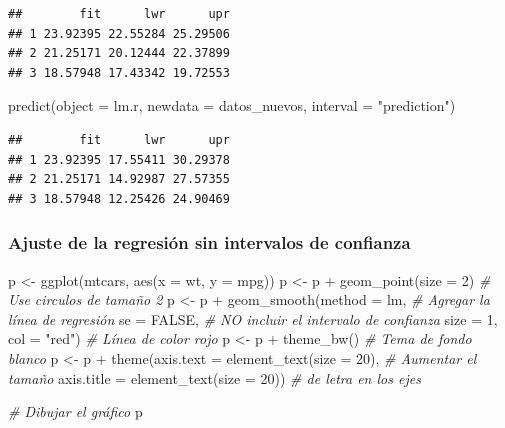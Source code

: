 \documentclass[
  12pt,
]{book}
\newenvironment{Shaded}{\begin{snugshade}}{\end{snugshade}}
\newcommand{\AttributeTok}[1]{\textcolor[rgb]{0.77,0.63,0.00}{#1}}
\newcommand{\CommentTok}[1]{\textcolor[rgb]{0.56,0.35,0.01}{\textit{#1}}}
\newcommand{\ConstantTok}[1]{\textcolor[rgb]{0.00,0.00,0.00}{#1}}
\newcommand{\DecValTok}[1]{\textcolor[rgb]{0.00,0.00,0.81}{#1}}
\newcommand{\FunctionTok}[1]{\textcolor[rgb]{0.00,0.00,0.00}{#1}}
\newcommand{\NormalTok}[1]{#1}
\newcommand{\OtherTok}[1]{\textcolor[rgb]{0.56,0.35,0.01}{#1}}
\newcommand{\SpecialCharTok}[1]{\textcolor[rgb]{0.00,0.00,0.00}{#1}}
\newcommand{\StringTok}[1]{\textcolor[rgb]{0.31,0.60,0.02}{#1}}
\theoremstyle{definition}
\theoremstyle{definition}
\theoremstyle{definition}
\theoremstyle{definition}
\theoremstyle{remark}
\begin{document}
\begin{verbatim}
##        fit      lwr      upr
## 1 23.92395 22.55284 25.29506
## 2 21.25171 20.12444 22.37899
## 3 18.57948 17.43342 19.72553
\end{verbatim}

\begin{Shaded}
\begin{Highlighting}[]
\FunctionTok{predict}\NormalTok{(}\AttributeTok{object =}\NormalTok{ lm.r, }\AttributeTok{newdata =}\NormalTok{ datos\_nuevos, }\AttributeTok{interval =} \StringTok{"prediction"}\NormalTok{)}
\end{Highlighting}
\end{Shaded}

\begin{verbatim}
##        fit      lwr      upr
## 1 23.92395 17.55411 30.29378
## 2 21.25171 14.92987 27.57355
## 3 18.57948 12.25426 24.90469
\end{verbatim}

\hypertarget{ajuste-de-la-regresiuxf3n-sin-intervalos-de-confianza}{%
\subsubsection{Ajuste de la regresión sin intervalos de confianza}\label{ajuste-de-la-regresiuxf3n-sin-intervalos-de-confianza}}

\begin{Shaded}
\begin{Highlighting}[]
\NormalTok{p }\OtherTok{\textless{}{-}} \FunctionTok{ggplot}\NormalTok{(mtcars, }\FunctionTok{aes}\NormalTok{(}\AttributeTok{x =}\NormalTok{ wt, }\AttributeTok{y =}\NormalTok{ mpg)) }
\NormalTok{p }\OtherTok{\textless{}{-}}\NormalTok{ p }\SpecialCharTok{+} \FunctionTok{geom\_point}\NormalTok{(}\AttributeTok{size =} \DecValTok{2}\NormalTok{)       }\CommentTok{\# Use circulos de tamaño 2}
\NormalTok{p }\OtherTok{\textless{}{-}}\NormalTok{ p }\SpecialCharTok{+} \FunctionTok{geom\_smooth}\NormalTok{(}\AttributeTok{method =}\NormalTok{ lm,   }\CommentTok{\# Agregar la línea de regresión }
              \AttributeTok{se =} \ConstantTok{FALSE}\NormalTok{,           }\CommentTok{\# NO incluir el intervalo de confianza   }
              \AttributeTok{size =} \DecValTok{1}\NormalTok{,}
              \AttributeTok{col =} \StringTok{"red"}\NormalTok{)          }\CommentTok{\# Línea de color rojo }
\NormalTok{p }\OtherTok{\textless{}{-}}\NormalTok{ p }\SpecialCharTok{+} \FunctionTok{theme\_bw}\NormalTok{()                 }\CommentTok{\# Tema de fondo blanco}
\NormalTok{p }\OtherTok{\textless{}{-}}\NormalTok{ p }\SpecialCharTok{+} \FunctionTok{theme}\NormalTok{(}\AttributeTok{axis.text =} \FunctionTok{element\_text}\NormalTok{(}\AttributeTok{size =} \DecValTok{20}\NormalTok{),  }\CommentTok{\# Aumentar el tamaño }
               \AttributeTok{axis.title =} \FunctionTok{element\_text}\NormalTok{(}\AttributeTok{size =} \DecValTok{20}\NormalTok{)) }\CommentTok{\# de letra en los ejes}

\CommentTok{\# Dibujar el gráfico}
\NormalTok{p   }
\end{Highlighting}
\end{Shaded}
\end{document}
